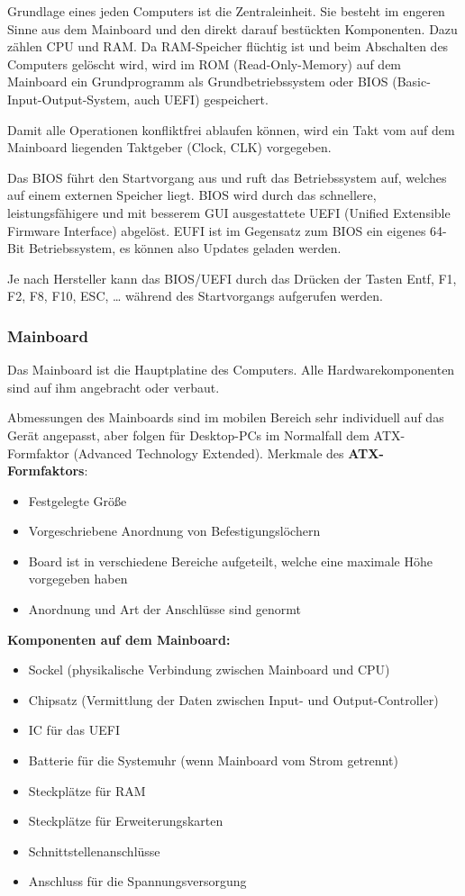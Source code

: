 \documentclass[10pt]{article}
\begin{document}
\begin{flushleft}
Grundlage eines jeden Computers ist die Zentraleinheit. Sie besteht im engeren Sinne aus dem Mainboard und den direkt darauf bestückten Komponenten. Dazu zählen CPU und RAM.
Da RAM-Speicher flüchtig ist und beim Abschalten des Computers gelöscht wird, wird im ROM (Read-Only-Memory) auf dem Mainboard ein Grundprogramm als Grundbetriebssystem oder BIOS (Basic-Input-Output-System, auch UEFI) gespeichert.

Damit alle Operationen konfliktfrei ablaufen können, wird ein Takt vom auf dem Mainboard liegenden Taktgeber (Clock, CLK) vorgegeben.

Das BIOS führt den Startvorgang aus und ruft das Betriebssystem auf, welches auf einem externen Speicher liegt.
BIOS wird durch das schnellere, leistungsfähigere und mit besserem GUI ausgestattete UEFI (Unified Extensible Firmware Interface) abgelöst. EUFI ist im Gegensatz zum BIOS ein eigenes 64-Bit Betriebssystem, es können also Updates geladen werden.

Je nach Hersteller kann das BIOS/UEFI durch das Drücken der Tasten Entf, F1, F2, F8, F10, ESC, … während des Startvorgangs aufgerufen werden.


\subsubsection{Mainboard}

Das Mainboard ist die Hauptplatine des Computers. Alle Hardwarekomponenten sind auf ihm angebracht oder verbaut.

Abmessungen des Mainboards sind im mobilen Bereich sehr individuell auf das Gerät angepasst, aber folgen für Desktop-PCs im Normalfall dem ATX-Formfaktor (Advanced Technology Extended). Merkmale des \textbf{ATX-Formfaktors}:

\begin{itemize}
    \item Festgelegte Größe
    \item Vorgeschriebene Anordnung von Befestigungslöchern
    \item Board ist in verschiedene Bereiche aufgeteilt, welche eine maximale Höhe vorgegeben haben
    \item Anordnung und Art der Anschlüsse sind genormt
\end{itemize}

\textbf{Komponenten auf dem Mainboard:}
\begin{itemize}
    \item Sockel (physikalische Verbindung zwischen Mainboard und CPU)
    \item Chipsatz (Vermittlung der Daten zwischen Input- und Output-Controller)
    \item IC für das UEFI
    \item Batterie für die Systemuhr (wenn Mainboard vom Strom getrennt)
    \item Steckplätze für RAM
    \item Steckplätze für Erweiterungskarten
    \item Schnittstellenanschlüsse
    \item Anschluss für die Spannungsversorgung
\end{itemize}


\end{flushleft}
\end{document}
